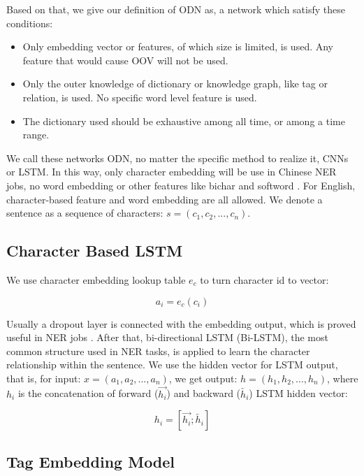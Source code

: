 \documentclass[letterpaper]{article} %
\begin{document}
Based on that, we give our definition of ODN as, a network which satisfy these conditions:

\begin{itemize}
\item Only embedding vector or features, of which size is limited, is used. Any feature that would cause OOV will not be used.
\item Only the outer knowledge of dictionary or knowledge graph, like tag or relation, is used. No specific word level feature is used.
\item The dictionary used should be exhaustive among all time, or among a time range.
\end{itemize}

We call these networks ODN, no matter the specific method to realize it, CNNs or LSTM. In this way, only character embedding will be use in Chinese NER jobs, no word embedding or other features like bichar \cite{bichar} and softword \cite{peng16}. For English, character-based feature and word embedding are all allowed. We denote a sentence as a sequence of characters: $s = (c_1, c_2, ..., c_n)$.

\subsection{Character Based LSTM}

We use character embedding lookup table $e_c$ to turn character id to vector:

\begin{equation}
a_i = e_c(c_i) \label{char_embedding}
\end{equation}

Usually a dropout layer is connected with the embedding output, which is proved useful in NER jobs \cite{mahovy}. After that, bi-directional LSTM (Bi-LSTM), the most common structure used in NER tasks, is applied to learn the character relationship within the sentence. We use the hidden vector for LSTM output, that is, for input: $x = (a_1, a_2, ..., a_n) $,  we get output: $h = (h_1, h_2, ..., h_n)$, where $h_i$ is the concatenation of forward ($\overrightarrow{h_i}$) and backward ($\overleftarrow{h_i}$) LSTM hidden vector:

\begin{equation}
h_i = [\overrightarrow{h_i};\overleftarrow{h_i}] \label{lstm_out}
\end{equation}

\subsection{Tag Embedding Model}
\end{document}
